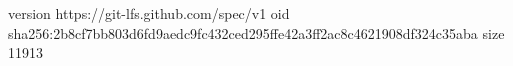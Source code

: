 version https://git-lfs.github.com/spec/v1
oid sha256:2b8cf7bb803d6fd9aedc9fc432ced295ffe42a3ff2ac8c4621908df324c35aba
size 11913

